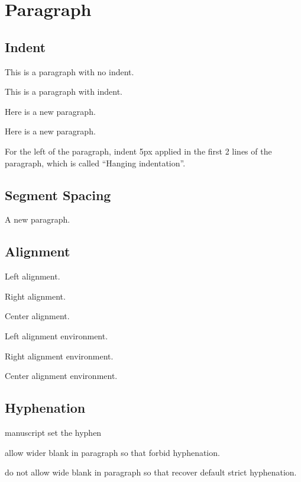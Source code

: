 \section{Paragraph}
\subsection{Indent}
{\noindent
This is a paragraph with no indent. \par
\indent
This is a paragraph with indent.}

{\setlength\parindent{4em}
Here is a new paragraph. \par
\addtolength\parindent{2em}
Here is a new paragraph.}

{\hangindent=5pc 
For the left of the paragraph, indent 5px applied in the first 2 lines of the paragraph, 
which is called ``Hanging indentation''.}

\subsection{Segment Spacing}
{\setlength\parskip{3pt}    %
\setlength\leftskip{4em} \setlength\rightskip{1em}
A new paragraph.}

\subsection{Alignment}
{\raggedright
Left alignment. \par
\raggedleft
Right alignment. \par
\centering
Center alignment.}

\begin{flushleft}
    Left alignment environment.
\end{flushleft}

\begin{flushright}
    Right alignment environment.
\end{flushright}

\begin{center}
    Center alignment environment.
\end{center}

\subsection{Hyphenation}
man\-u\-script set the hyphen

{\sloppy
allow wider blank in paragraph so that forbid hyphenation. \par
\fussy
do not allow wide blank in paragraph so that recover default strict hyphenation.}

